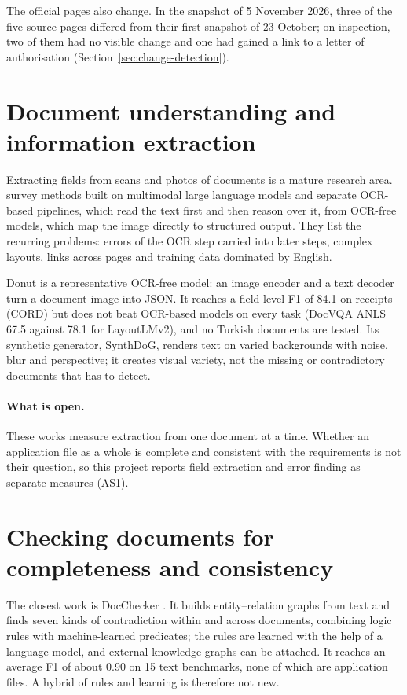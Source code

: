 The official pages also change. In the snapshot of 5 November 2026, three of the five source
pages differed from their first snapshot of 23 October; on inspection, two of them had no visible
change and one had gained a link to a letter of authorisation (Section~\ref{sec:change-detection}).

\section{Document understanding and information extraction}
Extracting fields from scans and photos of documents is a mature research area.
\textcite{ding2026mllm} survey methods built on multimodal large language models and separate
OCR-based pipelines, which read the text first and then reason over it, from OCR-free models,
which map the image directly to structured output. They list the recurring problems: errors of
the OCR step carried into later steps, complex layouts, links across pages and training data
dominated by English.

Donut \autocite{kim2022donut} is a representative OCR-free model: an image encoder and a text
decoder turn a document image into JSON. It reaches a field-level F1 of 84.1 on receipts (CORD)
but does not beat OCR-based models on every task (DocVQA ANLS 67.5 against 78.1 for LayoutLMv2),
and no Turkish documents are tested. Its synthetic generator, SynthDoG, renders text on varied
backgrounds with noise, blur and perspective; it creates visual variety, not the missing or
contradictory documents that \project{} has to detect.

\paragraph{What is open.} These works measure extraction from one document at a time. Whether
an application file as a whole is complete and consistent with the requirements is not their
question, so this project reports field extraction and error finding as separate measures (AS1).

\section{Checking documents for completeness and consistency}
The closest work is DocChecker \autocite{chen2026contradictions}. It builds entity--relation
graphs from text and finds seven kinds of contradiction within and across documents, combining
logic rules with machine-learned predicates; the rules are learned with the help of a language
model, and external knowledge graphs can be attached. It reaches an average F1 of about 0.90 on
15 text benchmarks, none of which are application files. A hybrid of rules and learning is
therefore not new.

